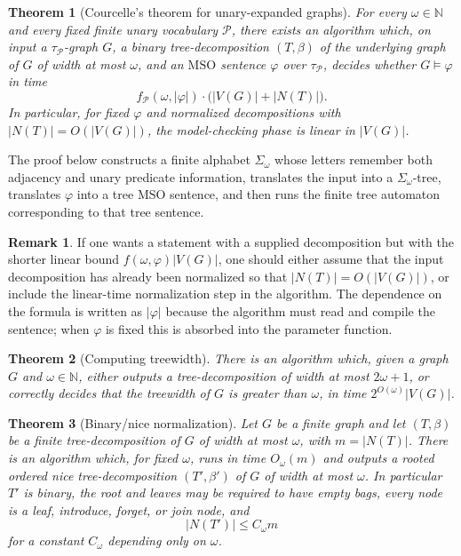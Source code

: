\documentclass[11pt]{article}
\newtheorem{theorem}{Theorem}
\theoremstyle{definition}
\newtheorem*{remark}{Remark}
\newcommand{\MSO}{\ensuremath{\mathrm{MSO}}}
\newcommand{\Pred}{\mathcal P}
\begin{document}
\begin{theorem}[Courcelle's theorem for unary-expanded graphs]\label{thm:courcelle}
For every \(\omega\in\mathbb N\) and every fixed finite unary vocabulary
\(\Pred\), there exists an algorithm which, on input a \(\tau_{\Pred}\)-graph
\(G\), a binary tree-decomposition \((T,\beta)\) of the underlying graph of \(G\)
of width at most \(\omega\), and an \MSO{} sentence \(\varphi\) over
\(\tau_{\Pred}\), decides whether \(G\models\varphi\) in time
\[
  f_{\Pred}(\omega,|\varphi|)\cdot\bigl(|V(G)|+|N(T)|\bigr).
\]
In particular, for fixed \(\varphi\) and normalized decompositions with
\(|N(T)|=O(|V(G)|)\), the model-checking phase is linear in \(|V(G)|\).
\end{theorem}

The proof below constructs a finite alphabet \(\Sigma_\omega\) whose letters
remember both adjacency and unary predicate information, translates the input
into a \(\Sigma_\omega\)-tree, translates \(\varphi\) into a tree \MSO{} sentence,
and then runs the finite tree automaton corresponding to that tree sentence.

\begin{remark}
If one wants a statement with a supplied decomposition but with the shorter
linear bound \(f(\omega,\varphi)|V(G)|\), one should either assume that the input
decomposition has already been normalized so that \(|N(T)|=O(|V(G)|)\), or include
the linear-time normalization step in the algorithm.  The dependence on the
formula is written as \(|\varphi|\) because the algorithm must read and compile
the sentence; when \(\varphi\) is fixed this is absorbed into the parameter
function.
\end{remark}

\begin{theorem}[Computing treewidth]
There is an algorithm which, given a graph \(G\) and \(\omega\in\mathbb N\),
either outputs a tree-decomposition of width at most \(2\omega+1\), or correctly
decides that the treewidth of \(G\) is greater than \(\omega\), in time
\(2^{O(\omega)}|V(G)|\).
\end{theorem}

\begin{theorem}[Binary/nice normalization]\label{thm:binary-nice-normalization}
Let \(G\) be a finite graph and let \((T,\beta)\) be a finite
tree-decomposition of \(G\) of width at most \(\omega\), with \(m=|N(T)|\).  There
is an algorithm which, for fixed \(\omega\), runs in time \(O_\omega(m)\) and
outputs a rooted ordered nice tree-decomposition \((T',\beta')\) of \(G\) of
width at most \(\omega\).  In particular \(T'\) is binary, the root and leaves
may be required to have empty bags, every node is a leaf, introduce, forget, or
join node, and
\[
  |N(T')|\le C_\omega m
\]
for a constant \(C_\omega\) depending only on \(\omega\).
\end{theorem}
\end{document}
